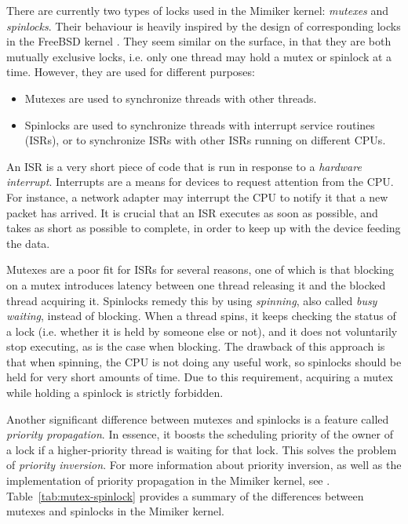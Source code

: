 \documentclass[shortabstract, manyadvisors, english, mgr]{iithesis}
\begin{document}
There are currently two types of locks used in the Mimiker kernel:
\textit{mutexes} and \textit{spinlocks}. Their behaviour is heavily inspired by
the design of corresponding locks in the FreeBSD kernel \cite{freebsd-locking}.
They seem similar on the surface, in that they are both mutually exclusive
locks, i.e. only one thread may hold a mutex or spinlock at a time. However,
they are used for different purposes:
\begin{itemize}
\item Mutexes are used to synchronize threads with other threads.
\item Spinlocks are used to synchronize threads with interrupt service routines
  (ISRs), or to synchronize ISRs with other ISRs running on different CPUs.
\end{itemize}
An ISR is a very short piece of code that is run in response to a
\textit{hardware interrupt}. Interrupts are a means for devices to request
attention from the CPU. For instance, a network adapter may interrupt the CPU to
notify it that a new packet has arrived. It is crucial that an ISR executes as
soon as possible, and takes as short as possible to complete, in order to keep
up with the device feeding the data.

Mutexes are a poor fit for ISRs for several reasons, one of which is that
blocking on a mutex introduces latency between one thread releasing it and the
blocked thread acquiring it. Spinlocks remedy this by using \textit{spinning},
also called \textit{busy waiting}, instead of blocking. When a thread spins, it
keeps checking the status of a lock (i.e. whether it is held by someone else or
not), and it does not voluntarily stop executing, as is the case when blocking.
The drawback of this approach is that when spinning, the CPU is not doing any
useful work, so spinlocks should be held for very short amounts of time. Due to
this requirement, acquiring a mutex while holding a spinlock is strictly forbidden.

Another significant difference between mutexes and spinlocks is a feature called
\textit{priority propagation}. In essence, it boosts the scheduling priority of
the owner of a lock if a higher-priority thread is waiting for that lock. This
solves the problem of \textit{priority inversion}. For more information about
priority inversion, as well as the implementation of priority propagation in the
Mimiker kernel, see \cite{julian-thesis}. Table~\ref{tab:mutex-spinlock}
provides a summary of the differences between mutexes and spinlocks in the
Mimiker kernel.
\end{document}
